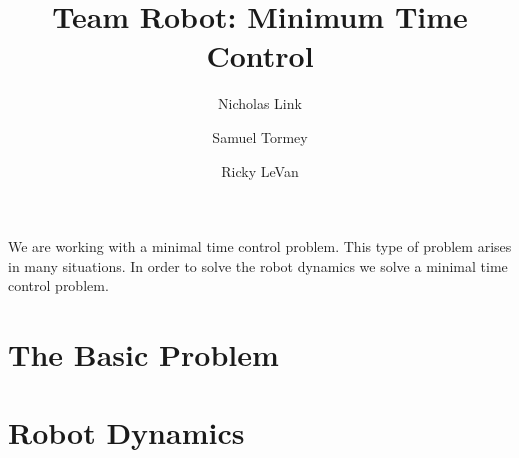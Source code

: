 \documentclass [12pt, notitlepage]{article}
\title{Team Robot: Minimum Time Control}
\author{Nicholas Link
\and Samuel Tormey
\and Ricky LeVan}
\begin{document}
\maketitle

We are working with a minimal time control problem. This type of problem arises in many situations. In order to solve the robot dynamics we solve a minimal time control problem.



\section{The Basic Problem}



\section{Robot Dynamics}
\end{document}
